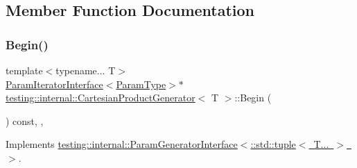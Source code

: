 \subsection{Member Function Documentation}
\mbox{\label{classtesting_1_1internal_1_1_cartesian_product_generator_ad2f1bc6289b6dd7e4b5f4fecbfdf2883}} 
\subsubsection{\texorpdfstring{Begin()}{Begin()}\hspace{0.1cm}{\footnotesize\ttfamily [1/2]}}
{\footnotesize\ttfamily template$<$typename... T$>$ \\
\mbox{\hyperlink{classtesting_1_1internal_1_1_param_iterator_interface}{Param\+Iterator\+Interface}}$<$\mbox{\hyperlink{classtesting_1_1internal_1_1_cartesian_product_generator_af27131157a9347f0c82420ca081ee7dd}{Param\+Type}}$>$$\ast$ \mbox{\hyperlink{classtesting_1_1internal_1_1_cartesian_product_generator}{testing\+::internal\+::\+Cartesian\+Product\+Generator}}$<$ T $>$\+::Begin (\begin{DoxyParamCaption}{ }\end{DoxyParamCaption}) const\hspace{0.3cm}{\ttfamily [inline]}, {\ttfamily [override]}, {\ttfamily [virtual]}}



Implements \mbox{\hyperlink{classtesting_1_1internal_1_1_param_generator_interface_ae1de83b16fe9a53c67778a026c6a9569}{testing\+::internal\+::\+Param\+Generator\+Interface$<$\+::std\+::tuple$<$ T... $>$ $>$}}.

\mbox{\label{classtesting_1_1internal_1_1_cartesian_product_generator_ad2f1bc6289b6dd7e4b5f4fecbfdf2883}} 
